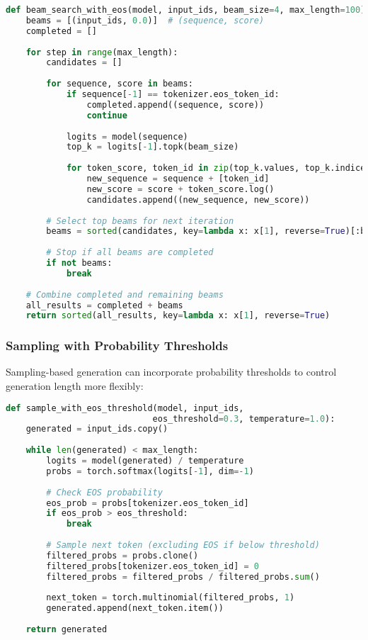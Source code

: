\begin{lstlisting}[language=Python, caption=Beam search with \eos{} handling]
def beam_search_with_eos(model, input_ids, beam_size=4, max_length=100):
    beams = [(input_ids, 0.0)]  # (sequence, score)
    completed = []
    
    for step in range(max_length):
        candidates = []
        
        for sequence, score in beams:
            if sequence[-1] == tokenizer.eos_token_id:
                completed.append((sequence, score))
                continue
                
            logits = model(sequence)
            top_k = logits[-1].topk(beam_size)
            
            for token_score, token_id in zip(top_k.values, top_k.indices):
                new_sequence = sequence + [token_id]
                new_score = score + token_score.log()
                candidates.append((new_sequence, new_score))
        
        # Select top beams for next iteration
        beams = sorted(candidates, key=lambda x: x[1], reverse=True)[:beam_size]
        
        # Stop if all beams are completed
        if not beams:
            break
    
    # Combine completed and remaining beams
    all_results = completed + beams
    return sorted(all_results, key=lambda x: x[1], reverse=True)
\end{lstlisting}

\subsubsection{Sampling with \eos{} Probability Thresholds}

Sampling-based generation can incorporate \eos{} probability thresholds to control generation length more flexibly:

\begin{lstlisting}[language=Python, caption=Sampling with \eos{} probability control]
def sample_with_eos_threshold(model, input_ids, 
                             eos_threshold=0.3, temperature=1.0):
    generated = input_ids.copy()
    
    while len(generated) < max_length:
        logits = model(generated) / temperature
        probs = torch.softmax(logits[-1], dim=-1)
        
        # Check EOS probability
        eos_prob = probs[tokenizer.eos_token_id]
        if eos_prob > eos_threshold:
            break
        
        # Sample next token (excluding EOS if below threshold)
        filtered_probs = probs.clone()
        filtered_probs[tokenizer.eos_token_id] = 0
        filtered_probs = filtered_probs / filtered_probs.sum()
        
        next_token = torch.multinomial(filtered_probs, 1)
        generated.append(next_token.item())
    
    return generated
\end{lstlisting}

